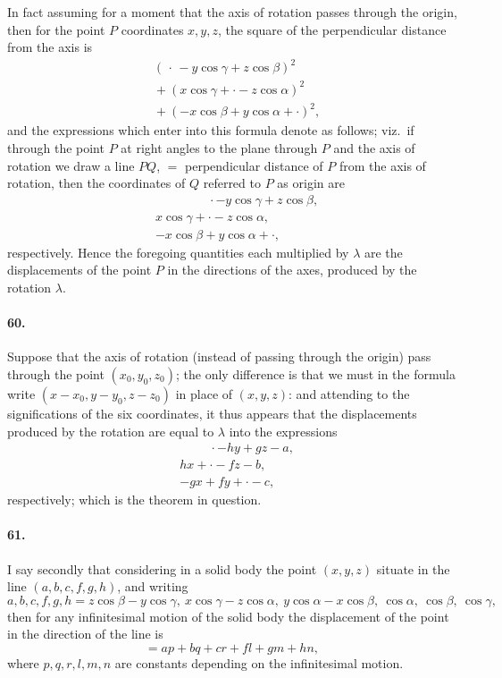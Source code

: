 \documentclass[11pt,a4paper]{article}
\begin{document}
In fact assuming for a moment that the axis of rotation passes through the origin,
then for the point $P$ coordinates $x, y, z$, the square of the perpendicular distance from
the axis is
\begin{align*}
&(\,\cdot\, - y\cos\gamma + z\cos\beta)^2 \\
&{}+ (x\cos\gamma + \cdot - z\cos\alpha)^2 \\
&{}+ (-x\cos\beta + y\cos\alpha + \cdot)^2,
\end{align*}
and the expressions which enter into this formula denote as follows; viz.\ if through
the point $P$ at right angles to the plane through $P$ and the axis of rotation we
draw a line $PQ$, $=$ perpendicular distance of $P$ from the axis of rotation, then the
coordinates of $Q$ referred to $P$ as origin are
\begin{align*}
&\phantom{x\cos\gamma + } \cdot - y\cos\gamma + z\cos\beta, \\
& x\cos\gamma + \cdot - z\cos\alpha, \\
& -x\cos\beta + y\cos\alpha + \cdot,
\end{align*}
respectively. Hence the foregoing quantities each multiplied by $\lambda$ are the
displacements of the point $P$ in the directions of the axes, produced by the rotation
$\lambda$.

\paragraph{60.}
Suppose that the axis of rotation (instead of passing through the origin) pass
through the point $(x_0, y_0, z_0)$; the only difference is that we must in the formula
write $(x - x_0, y - y_0, z - z_0)$ in place of $(x, y, z)$: and attending to the significations
of the six coordinates, it thus appears that the displacements produced by the rotation
are equal to $\lambda$ into the expressions
\begin{align*}
&\phantom{hx + } \cdot - hy + gz - a, \\
& hx + \cdot - fz - b, \\
& -gx + fy + \cdot - c,
\end{align*}
respectively; which is the theorem in question.

\paragraph{61.}
I say secondly that considering in a solid body the point $(x, y, z)$ situate in
the line $(a,b,c,f,g,h)$, and writing
\[
a, b, c, f, g, h = z\cos\beta - y\cos\gamma,\ x\cos\gamma - z\cos\alpha,\ y\cos\alpha - x\cos\beta,\
 \cos\alpha,\ \cos\beta,\ \cos\gamma,
\]
then for any infinitesimal motion of the solid body the displacement of the point in
the direction of the line is
\[
{} = ap + bq + cr + fl + gm + hn,
\]
where $p, q, r, l, m, n$ are constants depending on the infinitesimal motion.
\end{document}
